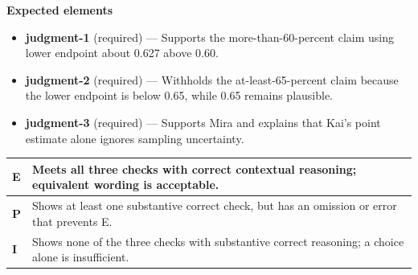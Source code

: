 \documentclass[11pt]{article}
\begin{document}

\textbf{Expected elements}
\begin{itemize}[leftmargin=1.5em,itemsep=2pt,topsep=2pt]
  \item \textbf{judgment-1} (required) --- Supports the more-than-60-percent claim using lower endpoint about 0.627 above 0.60.
  \item \textbf{judgment-2} (required) --- Withholds the at-least-65-percent claim because the lower endpoint is below 0.65, while 0.65 remains plausible.
  \item \textbf{judgment-3} (required) --- Supports Mira and explains that Kai's point estimate alone ignores sampling uncertainty.
\end{itemize}

{\small\renewcommand{\arraystretch}{1.25}
\noindent\begin{tabular}{|p{0.5in}|p{5.9in}|}
\hline
\textbf{E} & Meets all three checks with correct contextual reasoning; equivalent wording is acceptable. \\ \hline
\textbf{P} & Shows at least one substantive correct check, but has an omission or error that prevents E. \\ \hline
\textbf{I} & Shows none of the three checks with substantive correct reasoning; a choice alone is insufficient. \\ \hline
\end{tabular}}

\clearpage
{}
\end{document}

